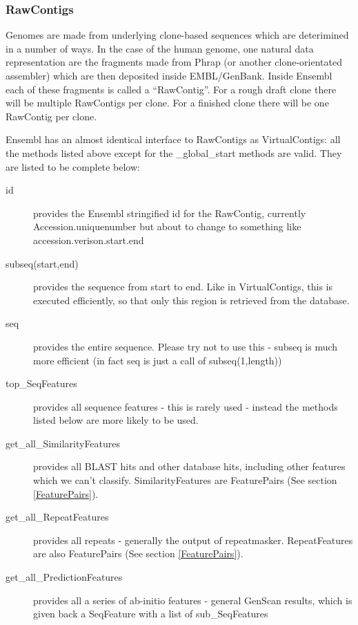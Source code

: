\documentclass[11pt,a4paper]{article}
\begin{document}
\subsubsection{RawContigs}

Genomes are made from underlying clone-based sequences which are
deterimined in a number of ways. In the case of the human genome, one
natural data representation are the fragments made from Phrap (or
another clone-orientated assembler) which are then deposited inside
EMBL/GenBank. Inside Ensembl each of these fragments is called a
``RawContig''. For a rough draft clone there will be multiple
RawContigs per clone. For a finished clone there will be one
RawContig per clone.

Ensembl has an almost identical interface to RawContigs as VirtualContigs:
all the methods listed above except for the \_global\_start methods are valid.
They are listed to be complete below:


\begin{description}

\item[id] provides the Ensembl stringified id for the RawContig,
currently Accession.uniquenumber but about to change to something
like accession.verison.start.end


\item[subseq(start,end)] provides the sequence from start to end. Like in VirtualContigs,
this is executed efficiently, so that only this region is retrieved from the database.

\item[seq] provides the entire sequence. Please try not to use this - subseq is much more
efficient (in fact seq is just a call of subseq(1,length))

\item[top\_SeqFeatures] provides all sequence features - this is rarely used - instead the
methods listed below are more likely to be used.

\item[get\_all\_SimilarityFeatures] provides all BLAST hits and other
database hits, including other features which we can't
classify. SimilarityFeatures are FeaturePairs (See section
\ref{FeaturePairs}).

\item[get\_all\_RepeatFeatures] provides all repeats - generally the
output of repeatmasker. RepeatFeatures are also FeaturePairs (See
section \ref{FeaturePairs}).

\item[get\_all\_PredictionFeatures] provides all a series of ab-initio
features - general GenScan results, which is given back a SeqFeature
with a list of sub\_SeqFeatures

\end{description}
\end{document}
